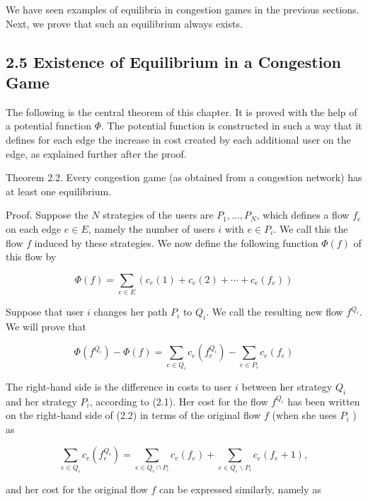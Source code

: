 \documentclass[12pt]{article}
\begin{document}
We have seen examples of equilibria in congestion games in the previous sections. Next, we prove that such an equilibrium always exists.

\subsection*{2.5 Existence of Equilibrium in a Congestion Game}
The following is the central theorem of this chapter. It is proved with the help of a potential function $\Phi$. The potential function is constructed in such a way that it defines for each edge the increase in cost created by each additional user on the edge, as explained further after the proof.

Theorem 2.2. Every congestion game (as obtained from a congestion network) has at least one equilibrium.

Proof. Suppose the $N$ strategies of the users are $P_{1}, \ldots, P_{N}$, which defines a flow $f_{e}$ on each edge $e \in E$, namely the number of users $i$ with $e \in P_{i}$. We call this the flow $f$ induced by these strategies. We now define the following function $\Phi(f)$ of this flow by


\begin{equation*}
\Phi(f)=\sum_{e \in E}\left(c_{e}(1)+c_{e}(2)+\cdots+c_{e}\left(f_{e}\right)\right) \tag{2.3}
\end{equation*}


Suppose that user $i$ changes her path $P_{i}$ to $Q_{i}$. We call the resulting new flow $f^{Q_{i}}$. We will prove that


\begin{equation*}
\Phi\left(f^{Q_{i}}\right)-\Phi(f)=\sum_{e \in Q_{i}} c_{e}\left(f_{e}^{Q_{i}}\right)-\sum_{e \in P_{i}} c_{e}\left(f_{e}\right) \tag{2.4}
\end{equation*}


The right-hand side is the difference in costs to user $i$ between her strategy $Q_{i}$ and her strategy $P_{i}$, according to (2.1). Her cost for the flow $f^{Q_{i}}$ has been written on the right-hand side of (2.2) in terms of the original flow $f$ (when she uses $P_{i}$ ) as


\begin{equation*}
\sum_{e \in Q_{i}} c_{e}\left(f_{e}^{Q_{i}}\right)=\sum_{e \in Q_{i} \cap P_{i}} c_{e}\left(f_{e}\right)+\sum_{e \in Q_{i} \backslash P_{i}} c_{e}\left(f_{e}+1\right), \tag{2.5}
\end{equation*}


and her cost for the original flow $f$ can be expressed similarly, namely as
\end{document}
